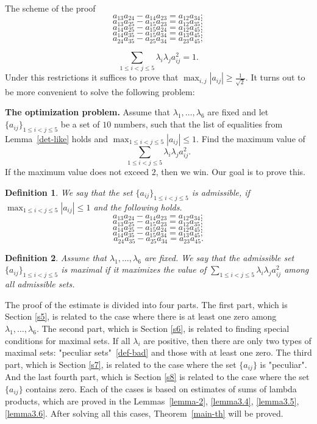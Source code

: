 \documentclass[12pt]{article}
\newtheorem{definition}{Definition}[section]
\begin{document}
\begin{section}{The scheme of the proof}
        $$
            a_{13}a_{24} - a_{14}a_{23} = a_{12}a_{34};
        $$
        $$
            a_{13}a_{25} - a_{15}a_{23} = a_{12}a_{35};
        $$
        $$
            a_{14}a_{25} - a_{15}a_{24} = a_{12}a_{45};
        $$
        $$
            a_{14}a_{35} - a_{15}a_{34} = a_{13}a_{45};
        $$
        $$
            a_{24}a_{35} - a_{25}a_{34} = a_{23}a_{45};
        $$

        $$
            \sum_{1\leq i<j\leq 5} \lambda_{i}\lambda_{j}a_{ij}^2= 1.
        $$
        Under this restrictions it suffices to prove that $\max_{i,j}|a_{ij}|\geq \frac{1}{\sqrt{2}}.$ It turns out to be more convenient to solve the following problem:

        \textbf{The optimization problem.} Assume that $\lambda_{1},\ldots, \lambda_{6}$ are fixed and let $\{a_{ij}\}_{1\leq i<j\leq 5}$ be a set of $10$ numbers, such that the list of equalities from Lemma~\ref{det-like} holds and $\max_{1\leq i<j\leq 5} |a_{ij}| \leq 1$. Find the maximum value of $$\sum_{1\leq i<j\leq 5}\lambda_{i}\lambda_{j}a_{ij}^2.$$ 
        If the maximum value does not exceed $2$, then we win. Our goal is to prove this. 
        
    \begin{definition}
        We say that the set $\{a_{ij}\}_{1\leq i<j\leq 5}$ is admissible, if  $\max_{1\leq i<j\leq 5} |a_{ij}| \leq 1$ and the following holds.
        $$
            a_{13}a_{24} - a_{14}a_{23} = a_{12}a_{34};
        $$
        $$
            a_{13}a_{25} - a_{15}a_{23} = a_{12}a_{35};
        $$
        $$
            a_{14}a_{25} - a_{15}a_{24} = a_{12}a_{45};
        $$
        $$
            a_{14}a_{35} - a_{15}a_{34} = a_{13}a_{45};
        $$
        $$
            a_{24}a_{35} - a_{25}a_{34} = a_{23}a_{45}.
        $$
    
    \end{definition}

\begin{definition} Assume that $\lambda_{1},\ldots, \lambda_{6}$ are fixed. 
    We say that the admissible set  $\{a_{ij}\}_{1\leq i<j\leq 5}$ is maximal if it maximizes the value of  $\sum_{1\leq i<j\leq 5}\lambda_{i}\lambda_{j}a_{ij}^2$ among all admissible sets.
\end{definition}

The proof of the estimate is divided into four parts. The first part, which is Section \ref{s5}, is related to the case where there is at least one zero among $\lambda_{1},\ldots,\lambda_{6}.$ The second part, which is Section \ref{s6}, is related to finding special conditions for maximal sets. If all $\lambda_{i}$ are positive, then there are only two types of maximal sets: "peculiar sets"~\ref{def-bad} and those with at least one zero. The third part, which is Section \ref{s7}, is related to the case where the set $\{a_{ij}\}$ is "peculiar". And the last fourth part, which is Section \ref{s8} is related to the case where the set $\{a_{ij}\}$ contains zero. Each of the cases is based on estimates of sums of lambda products, which are proved in the Lemmas~\ref{lemma-2}, \ref{lemma3.4}, \ref{lemma3.5}, \ref{lemma3.6}. After solving all this cases, Theorem~\ref{main-th} will be proved. 


\end{section}
\end{document}
